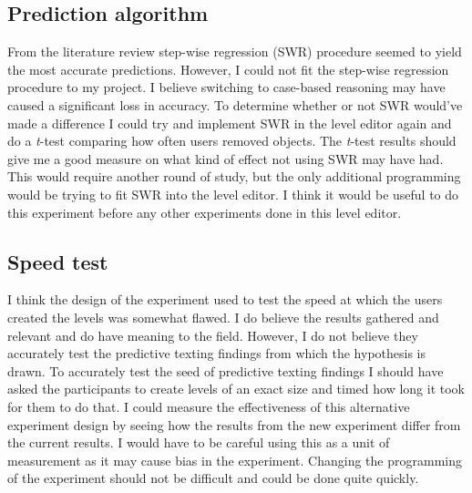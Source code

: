 \documentclass[journal]{IEEEtran}
\begin{document}
\subsection{Prediction algorithm}
From the literature review step-wise regression (SWR) procedure seemed to yield the most accurate predictions. However, I could not fit the step-wise regression procedure to my project. I believe switching to case-based reasoning may have caused a significant loss in accuracy. To determine whether or not SWR would've made a difference I could try and implement SWR in the level editor again and do a \textit{t}-test comparing how often users removed objects. The \textit{t}-test results should give me a good measure on what kind of effect not using SWR may have had. This would require another round of study, but the only additional programming would be trying to fit SWR into the level editor. I think it would be useful to do this experiment before any other experiments done in this level editor.

\subsection{Speed test}
I think the design of the experiment used to test the speed at which the users created the levels was somewhat flawed. I do believe the results gathered and relevant and do have meaning to the field. However,  I do not believe they accurately test the predictive texting findings from which the hypothesis is drawn. To accurately test the seed of predictive texting findings I should have asked the participants to create levels of an exact size and timed how long it took for them to do that. I could measure the effectiveness of this alternative experiment design by seeing how the results from the new experiment differ from the current results. I would have to be careful using this as a unit of measurement as it may cause bias in the experiment. Changing the programming of the experiment should not be difficult and could be done quite quickly.
\end{document}
